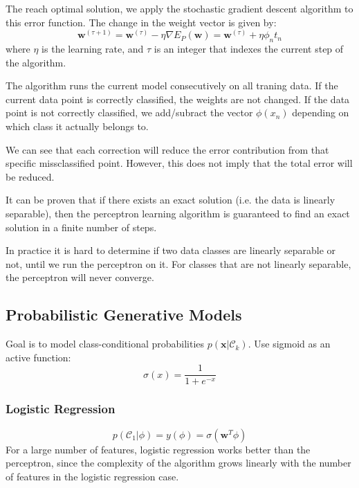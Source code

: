 \documentclass[11pt]{article}
\begin{document}
  The reach optimal solution, we apply the stochastic gradient descent
  algorithm to this error function. The change in the weight vector is given
  by:
  \begin{equation*}
    \textbf{w}^{(\tau + 1)}
    = \textbf{w}^{(\tau)} - \eta \nabla E_P(\textbf{w})
    = \textbf{w}^{(\tau)} + \eta \phi_n t_n
  \end{equation*}
  where $\eta$ is the learning rate, and $\tau$ is an integer that indexes the
  current step of the algorithm.

  The algorithm runs the current model consecutively on all traning data. If
  the current data point is correctly classified, the weights are not changed.
  If the data point is not correctly classified, we add/subract the vector
  $\phi(x_n)$ depending on which class it actually belongs to.

  We can see that each correction will reduce the error contribution from that
  specific missclassified point. However, this does not imply that the total
  error will be reduced.

  It can be proven that if there exists an exact solution (i.e. the data is
  linearly separable), then the perceptron learning algorithm is guaranteed to
  find an exact solution in a finite number of steps.

  In practice it is hard to determine if two data classes are linearly
  separable or not, until we run the perceptron on it. For classes that are not
  linearly separable, the perceptron will never converge.

  \subsection{Probabilistic Generative Models}
  Goal is to model class-conditional probabilities
  $p(\textbf{x}|\mathcal{C}_k)$. Use sigmoid as an active function:
  \begin{equation*}
    \sigma(x) = \frac{1}{1+e^{-x}}
  \end{equation*}
  \subsubsection{Logistic Regression}
  \begin{equation*}
    p(\mathcal{C}_1 | \phi) = y(\phi) = \sigma(\textbf{w}^T\phi)
  \end{equation*}
  For a large number of features, logistic regression works better than the
  perceptron, since the complexity of the algorithm grows linearly with the
  number of features in the logistic regression case.
\end{document}
